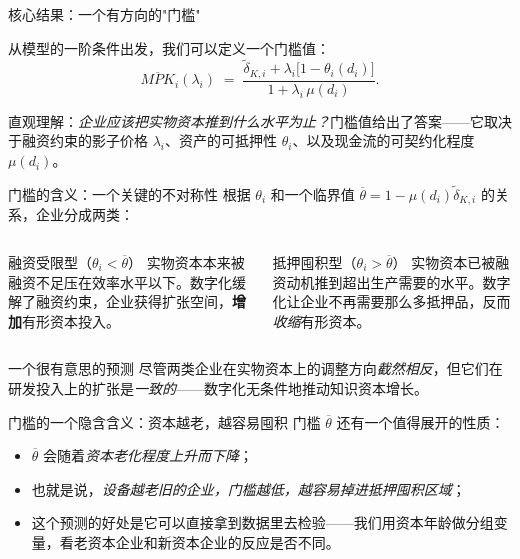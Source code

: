 \begin{frame}{核心结果：一个有方向的"门槛"}

  从模型的一阶条件出发，我们可以定义一个门槛值：
  \[
    \overline{MPK}_i(\lambda_i)
    \;=\;
    \frac{\tilde{\delta}_{K,i}+\lambda_i\bigl[1-\theta_i(d_i)\bigr]}
         {1+\lambda_i\,\mu(d_i)}.
  \]

  \vspace{0.3em}
  直观理解：\emph{企业应该把实物资本推到什么水平为止？}门槛值给出了答案——它取决于融资约束的影子价格 $\lambda_i$、资产的可抵押性 $\theta_i$、以及现金流的可契约化程度 $\mu(d_i)$。
\end{frame}

\begin{frame}{门槛的含义：一个关键的不对称性}
  根据 $\theta_i$ 和一个临界值 $\overline{\theta}=1-\mu(d_i)\tilde{\delta}_{K,i}$ 的关系，企业分成两类：

  \vspace{0.5em}
  \begin{columns}[T]
      \begin{methodbox}{融资受限型（$\theta_i<\overline{\theta}$）}
        实物资本本来被融资不足压在效率水平以下。数字化缓解了融资约束，企业获得扩张空间，\textbf{增加}有形资本投入。
      \end{methodbox}
      \begin{cautionbox}{抵押囤积型（$\theta_i>\overline{\theta}$）}
        实物资本已被融资动机推到超出生产需要的水平。数字化让企业不再需要那么多抵押品，反而\emph{收缩}有形资本。
      \end{cautionbox}
  \end{columns}

  \vspace{0.6em}
  \begin{findingbox}{一个很有意思的预测}
    尽管两类企业在实物资本上的调整方向\emph{截然相反}，但它们在研发投入上的扩张是\emph{一致的}——数字化无条件地推动知识资本增长。
  \end{findingbox}
\end{frame}



\begin{frame}{门槛的一个隐含含义：资本越老，越容易囤积}
  门槛 $\overline{\theta}$ 还有一个值得展开的性质：

  \begin{itemize}
    \item $\overline{\theta}$ 会随着\emph{资本老化程度上升而下降}；
    \item 也就是说，\emph{设备越老旧的企业，门槛越低，越容易掉进抵押囤积区域}；
    \item 这个预测的好处是它可以直接拿到数据里去检验——我们用资本年龄做分组变量，看老资本企业和新资本企业的反应是否不同。
  \end{itemize}
\end{frame}

